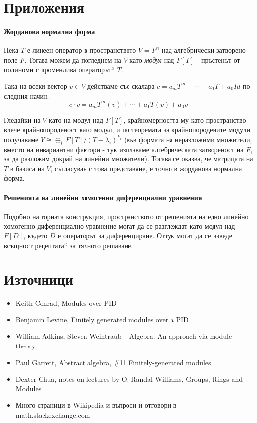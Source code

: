 \documentclass{article}
\newif\ifusemulticols
\theoremstyle{definition}
\theoremstyle{remark}
\theoremstyle{plain}
\theoremstyle{plain}
\newenvironment{mymulticols}
    { \ifusemulticols \begin{multicols}{2} \fi }
    { \ifusemulticols \end{multicols} \fi }
\begin{document}
\begin{mymulticols}
\section{Приложения}%
\paragraph{Жорданова нормална форма}
Нека $T$ е линеен оператор в пространството $V = F^n$ над алгебрически затворено поле $F$. Тогава
можем да погледнем на $V$ като \emph{модул} над $F[T]$ - пръстенът от полиноми с променлива
\quotedblbase операторът`` $T$.

Така на всеки вектор $v \in V$ действаме със скалара $c = a_m T^m + \cdots + a_1 T + a_0 Id$ по
следния начин:
$$c\cdot v = a_m T^m(v) + \cdots + a_1 T(v) + a_0 v$$

Гледайки на $V$ като на модул над $F[T]$, крайномерността му като пространство влече
крайнопороденост като модул, и по теоремата за крайнопородените модули получаваме $V \cong \oplus_i
\, F[T]/(T-\lambda_i)^{k_i}$ (във формата на неразложими множители, вместо на инвариантни фактори -
тук изплзваме алгебрическата затвореност на $F$, за да разложим докрай на линейни множители). Тогава
се оказва, че матрицата на $T$ в базиса на $V$, съгласуван с това представяне, е точно в жорданова
нормална форма.

\paragraph{Решенията на линейни хомогенни диференциални уравнения}
Подобно на горната конструкция, пространството от решенията на едно линейно хомогенно
диференциално уравнение могат да се разглеждат като модул над $F[D]$, където $D$ е операторът за
диференциране. Оттук могат да се изведе всъщност \quotedblbase рецептата`` за тяхното решаване.

\section{Източници}%

\begin{itemize}
    \item Keith Conrad, Modules over PID
    \item Benjamin Levine, Finitely generated modules over a PID
    \item William Adkins, Steven Weintraub -- Algebra. An approach via module theory
    \item Paul Garrett, Abstract algebra, \#11 Finitely-generated modules
    \item Dexter Chua, notes on lectures by O. Randal-Williams, Groups, Rings and Modules
    \item Много страници в Wikipedia и въпроси и отговори в math.stackexchange.com
\end{itemize}

\end{mymulticols}
\end{document}
